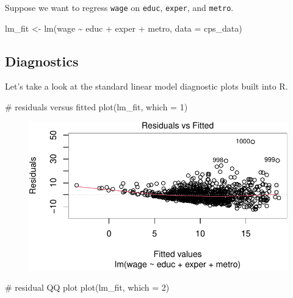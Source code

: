 \documentclass[
  11pt,
  letterpaper,
  oneside]{book}
\newenvironment{Shaded}{\begin{snugshade}}{\end{snugshade}}
\newcommand{\AttributeTok}[1]{\textcolor[rgb]{0.40,0.45,0.13}{#1}}
\newcommand{\CommentTok}[1]{\textcolor[rgb]{0.37,0.37,0.37}{#1}}
\newcommand{\DecValTok}[1]{\textcolor[rgb]{0.68,0.00,0.00}{#1}}
\newcommand{\FunctionTok}[1]{\textcolor[rgb]{0.28,0.35,0.67}{#1}}
\newcommand{\NormalTok}[1]{\textcolor[rgb]{0.00,0.23,0.31}{#1}}
\newcommand{\OtherTok}[1]{\textcolor[rgb]{0.00,0.23,0.31}{#1}}
\newcommand{\SpecialCharTok}[1]{\textcolor[rgb]{0.37,0.37,0.37}{#1}}
\theoremstyle{definition}
\theoremstyle{plain}
\theoremstyle{plain}
\theoremstyle{plain}
\theoremstyle{remark}
\begin{document}
Suppose we want to regress \texttt{wage} on \texttt{educ},
\texttt{exper}, and \texttt{metro}.

\begin{Shaded}
\begin{Highlighting}[]
\NormalTok{lm\_fit }\OtherTok{\textless{}{-}} \FunctionTok{lm}\NormalTok{(wage }\SpecialCharTok{\textasciitilde{}}\NormalTok{ educ }\SpecialCharTok{+}\NormalTok{ exper }\SpecialCharTok{+}\NormalTok{ metro, }\AttributeTok{data =}\NormalTok{ cps\_data)}
\end{Highlighting}
\end{Shaded}

\hypertarget{diagnostics}{%
\subsection{Diagnostics}\label{diagnostics}}

Let's take a look at the standard linear model diagnostic plots built
into R.

\begin{Shaded}
\begin{Highlighting}[]
\CommentTok{\# residuals versus fitted}
\FunctionTok{plot}\NormalTok{(lm\_fit, }\AttributeTok{which =} \DecValTok{1}\NormalTok{)}
\end{Highlighting}
\end{Shaded}

\begin{figure}[H]

{\centering \includegraphics{r-demo-part-3_files/figure-pdf/unnamed-chunk-4-1.pdf}

}

\end{figure}

\begin{Shaded}
\begin{Highlighting}[]
\CommentTok{\# residual QQ plot}
\FunctionTok{plot}\NormalTok{(lm\_fit, }\AttributeTok{which =} \DecValTok{2}\NormalTok{)}
\end{Highlighting}
\end{Shaded}
\end{document}
